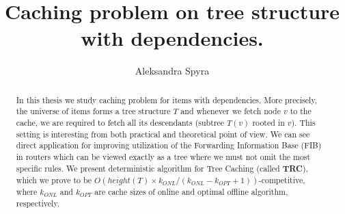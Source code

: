 \documentclass[a4paper,10pt]{article}
\title{Caching problem on tree structure with dependencies.}
\author{Aleksandra Spyra}
\begin{document}
\maketitle

\begin{abstract}
In this thesis we study caching problem for items with dependencies.
More precisely, the universe of items forms a tree structure $T$ and whenever
we fetch node $v$ to the cache, we are required to fetch all its descendants
(subtree $T(v)$ rooted in $v$). This setting is interesting from both practical 
and theoretical point of view. We can see direct application for improving 
utilization of the Forwarding Information Base (FIB) in routers which can be 
viewed exactly as a tree where we must not omit the most specific rules. We 
present deterministic algorithm for Tree Caching (called \textbf{TRC}), which 
we 
prove to be $O(height(T) \times k_{ONL}/(k_{ONL} - k_{OPT} + 1))$-competitive, 
where $k_{ONL}$ and $k_{OPT}$ are cache sizes of online and optimal offline 
algorithm, respectively. 
\end{abstract}

\tableofcontents





\printbibliography
\end{document}
